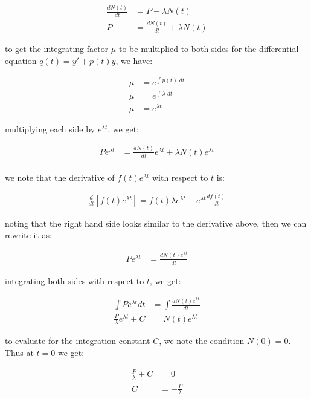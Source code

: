 \documentclass[11pt]{article}
\theoremstyle{definition}
\begin{document}
\begin{align}
    \frac{dN(t)}{dt} &= P - \lambda N(t)\\
    P &= \frac{dN(t)}{dt} + \lambda N(t)
\end{align}

to get the integrating factor $\mu$ to be multiplied to both sides for the differential equation $q(t) = y'+p(t)y$, we have:

\begin{align}
    \mu &= e^{\int p(t)\;dt}\\
    \mu &= e^{\int \lambda\; dt}\\
    \mu &= e^{\lambda t}
\end{align}

multiplying each side by $e^{\lambda t}$, we get:

\begin{align}
    Pe^{\lambda t} &= \frac{dN(t)}{dt}e^{\lambda t} + \lambda N(t)e^{\lambda t}\\
\end{align}

we note that the derivative of $f(t)e^{\lambda t}$ with respect to $t$ is:

\begin{align}
    \frac{d}{dt}[f(t)e^{\lambda t}] = f(t)\lambda e^{\lambda t} + e^{\lambda t} \frac{df(t)}{dt} 
\end{align}


noting that the right hand side looks similar to the derivative above, then we can rewrite it as:

\begin{align}
    Pe^{\lambda t} &= \frac{d N(t) e^{\lambda t}}{dt}
\end{align}

integrating both sides with respect to $t$, we get:

\begin{align}
    \int Pe^{\lambda t} dt &= \int \frac{d N(t) e^{\lambda t}}{dt}\\
    \frac{P}{\lambda} e^{\lambda t} + C &= N(t) e^{\lambda t}
\end{align}

to evaluate for the integration constant $C$, we note the condition $N(0)=0$. Thus at $t=0$ we get:

\begin{align}
    \frac{P}{\lambda} + C  &= 0\\
    C &= - \frac{P}{\lambda}
\end{align}
\end{document}
